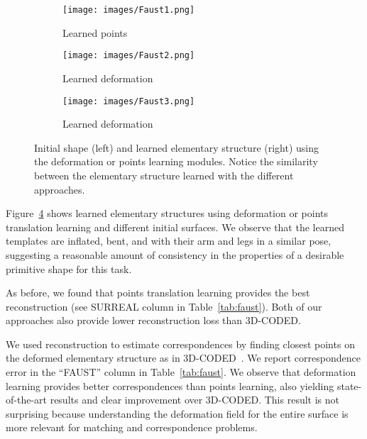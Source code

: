 \documentclass{article}
\renewcommand{\paragraph}[1]{\noindent{\bf #1}}
\begin{document}
\begin{figure}[t]
\vspace{-1em}
\centering
\begin{subfigure}{.32\textwidth}
  \centering
  \texttt{[image: images/Faust1.png]}
  \caption{Learned points}
  \label{fig:faust-point}
\end{subfigure}
\begin{subfigure}{.32\textwidth}
  \centering
  \texttt{[image: images/Faust2.png]}
  \caption{Learned deformation}
  \label{fig:faust-defo1}
\end{subfigure}
\begin{subfigure}{.32\textwidth}
  \centering
  \texttt{[image: images/Faust3.png]}
  \caption{Learned deformation}
  \label{fig:faut-defo2}
\end{subfigure}
\caption{Initial shape (left) and learned elementary structure (right) using the deformation or points learning modules. Notice the similarity between the elementary structure learned with the different approaches.}
\label{fig:faust}
\vspace{-1em}
\end{figure}

\vspace{-.2em}
\paragraph{Results.}
Figure~\ref{fig:faust} shows learned elementary structures using deformation or points translation learning and different initial surfaces. We observe that the learned templates are inflated, bent, and with their arm and legs in a similar pose, suggesting a reasonable amount of consistency in the properties of a desirable primitive shape for this task.


As before, we found that points translation learning provides the best reconstruction (see SURREAL column in Table~\ref{tab:faust}). Both of our approaches also provide lower reconstruction loss than 3D-CODED. 



We used reconstruction to estimate correspondences by finding closest points on the deformed elementary structure as in 3D-CODED~\cite{groueix2018b}. We report correspondence error in the ``FAUST'' column in Table~\ref{tab:faust}. We observe that deformation learning provides better correspondences than points learning, also yielding state-of-the-art results and clear improvement over 3D-CODED. This result is not surprising because understanding the deformation field for the entire surface is more relevant for matching and correspondence problems. 
\end{document}
